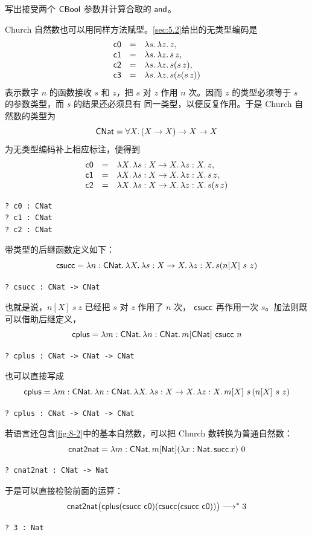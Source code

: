 \begin{exercise}[推荐，\(\star\)]
\label{ex:23.4.5}
写出接受两个 \(\mathsf{CBool}\) 参数并计算合取的
\(\mathsf{and}\)。
\end{exercise}

Church 自然数也可以用同样方法赋型。\cref{sec:5.2}给出的无类型编码是
\[
\begin{array}{rcl}
\mathsf{c0}&=&\lambda s.\,\lambda z.\,z,\\
\mathsf{c1}&=&\lambda s.\,\lambda z.\,s\,z,\\
\mathsf{c2}&=&\lambda s.\,\lambda z.\,s(s\,z),\\
\mathsf{c3}&=&\lambda s.\,\lambda z.\,s(s(s\,z))
\end{array}
\]
表示数字 \(n\) 的函数接收 \(s\) 和 \(z\)，把 \(s\) 对 \(z\) 作用 \(n\)
次。因而 \(z\) 的类型必须等于 \(s\) 的参数类型，而 \(s\) 的结果还必须具有
同一类型，以便反复作用。于是 Church 自然数的类型为
\[
\mathsf{CNat}=\forall X.\,(X\to X)\to X\to X
\]
为无类型编码补上相应标注，便得到
\[
\begin{array}{rcl}
\mathsf{c0}&=&\lambda X.\,\lambda s:X\to X.\,\lambda z:X.\,z,\\
\mathsf{c1}&=&\lambda X.\,\lambda s:X\to X.\,\lambda z:X.\,s\,z,\\
\mathsf{c2}&=&\lambda X.\,\lambda s:X\to X.\,\lambda z:X.\,s(s\,z)
\end{array}
\]
\begin{lstlisting}
? c0 : CNat
? c1 : CNat
? c2 : CNat
\end{lstlisting}
带类型的后继函数定义如下：
\[
\mathsf{csucc}
=\lambda n:\mathsf{CNat}.\,\lambda X.\,
  \lambda s:X\to X.\,\lambda z:X.\,s(n[X]\ s\ z)
\]
\begin{lstlisting}
? csucc : CNat -> CNat
\end{lstlisting}
也就是说，\(n[X]\ s\ z\) 已经把 \(s\) 对 \(z\) 作用了 \(n\) 次，
\(\mathsf{csucc}\) 再作用一次 \(s\)。加法则既可以借助后继定义，
\[
\mathsf{cplus}
=\lambda m:\mathsf{CNat}.\,\lambda n:\mathsf{CNat}.\,
 m[\mathsf{CNat}]\ \mathsf{csucc}\ n
\]
\begin{lstlisting}
? cplus : CNat -> CNat -> CNat
\end{lstlisting}
也可以直接写成
\[
\mathsf{cplus}
=\lambda m:\mathsf{CNat}.\,\lambda n:\mathsf{CNat}.\,
 \lambda X.\,\lambda s:X\to X.\,\lambda z:X.\,
 m[X]\ s\,(n[X]\ s\ z)
\]
\begin{lstlisting}
? cplus : CNat -> CNat -> CNat
\end{lstlisting}
若语言还包含\cref{fig:8-2}中的基本自然数，可以把 Church 数转换为普通自然数：
\[
\taplterm{cnat2nat}
=\lambda m:\tapltype{CNat}.\,
 m[\tapltype{Nat}](\lambda x:\tapltype{Nat}.\,\taplterm{succ}\,x)\ 0
\]
\begin{lstlisting}
? cnat2nat : CNat -> Nat
\end{lstlisting}
于是可以直接检验前面的运算：
\[
\mathsf{cnat2nat}
 \bigl(\mathsf{cplus}(\mathsf{csucc}\ \mathsf{c0})
 (\mathsf{csucc}(\mathsf{csucc}\ \mathsf{c0}))\bigr)
\longrightarrow^*3
\]
\begin{lstlisting}
? 3 : Nat
\end{lstlisting}

